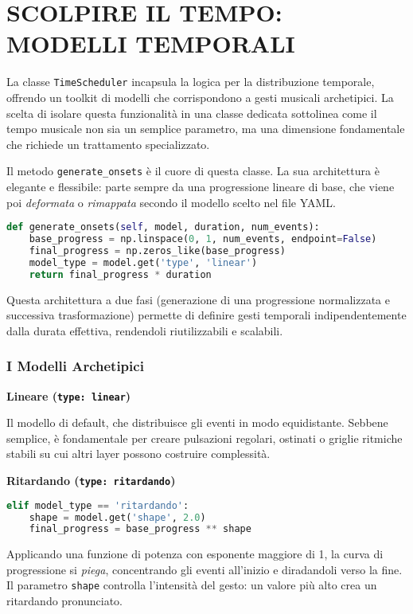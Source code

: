 
\section{SCOLPIRE IL TEMPO: MODELLI TEMPORALI}
La classe \texttt{TimeScheduler} incapsula la logica per la distribuzione temporale, offrendo un toolkit di modelli che corrispondono a gesti musicali archetipici. La scelta di isolare questa funzionalità in una classe dedicata sottolinea come il tempo musicale non sia un semplice parametro, ma una dimensione fondamentale che richiede un trattamento specializzato.

Il metodo \texttt{generate\_onsets} è il cuore di questa classe. La sua architettura è elegante e flessibile: parte sempre da una progressione lineare di base, che viene poi \textit{deformata} o \textit{rimappata} secondo il modello scelto nel file YAML.

\begin{lstlisting}[language=Python]
def generate_onsets(self, model, duration, num_events):
    base_progress = np.linspace(0, 1, num_events, endpoint=False)
    final_progress = np.zeros_like(base_progress)
    model_type = model.get('type', 'linear')
    return final_progress * duration
\end{lstlisting}

Questa architettura a due fasi (generazione di una progressione normalizzata e successiva trasformazione) permette di definire gesti temporali indipendentemente dalla durata effettiva, rendendoli riutilizzabili e scalabili.
\subsubsection{I Modelli Archetipici}
\textbf{Lineare (\texttt{type: linear})}

Il modello di default, che distribuisce gli eventi in modo equidistante. Sebbene semplice, è fondamentale per creare pulsazioni regolari, ostinati o griglie ritmiche stabili su cui altri layer possono costruire complessità.

\textbf{Ritardando (\texttt{type: ritardando})} 
\begin{lstlisting}[language=Python]
elif model_type == 'ritardando':
    shape = model.get('shape', 2.0)
    final_progress = base_progress ** shape
\end{lstlisting}
Applicando una funzione di potenza con esponente maggiore di 1, la curva di progressione si \textit{piega}, concentrando gli eventi all'inizio e diradandoli verso la fine. Il parametro \texttt{shape} controlla l'intensità del gesto: un valore più alto crea un ritardando pronunciato.

